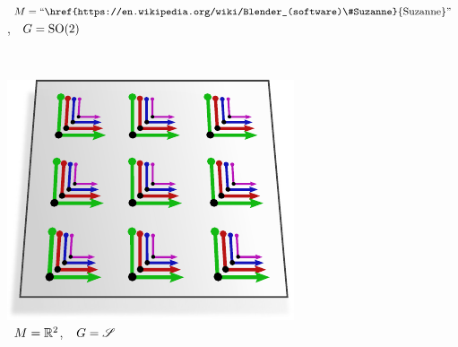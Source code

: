 \hfill
\begin{subfigure}[b]{0.26\textwidth}
    \centering
    \vspace*{-3.ex}
    \captionsetup{format=hang, width=1.1\textwidth}
    \caption{\small
        $M = \textup{``\href{https://en.wikipedia.org/wiki/Blender_(software)\#Suzanne}{Suzanne}''}$\!,
        \ $G = \operatorname{SO}(2)$
    }
    \label{fig:G_structure_intro_i}
\end{subfigure}
\\[2ex]
% 
% 
% 
% 
\begin{subfigure}[b]{0.26\textwidth}
    \centering
    \includegraphics[width=1.\textwidth]{figures/G_structure_R2_4_big.pdf}
    \captionsetup{format=hang}
    \caption{\small
        \,  $M = \mathbb{R}^2$,
        \,\ $G = \mathscr{S}$
    }
    \label{fig:G_structure_intro_j}
\end{subfigure}
